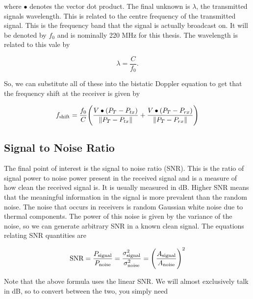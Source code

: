 \documentclass[12pt,openany,a4paper]{book}
\begin{document}
\bigskip

where $\bullet$ denotes the vector dot product. The final unknown is $\lambda$, the transmitted signals wavelength. This is related to the centre frequency of the transmitted signal. This is the frequency band that the signal is actually broadcast on. It will be denoted by $f_0$ and is nominally 220 MHz for this thesis. The wavelength is related to this vale by

\begin{equation}
\lambda = \frac{C}{f_0}.
\end{equation}

\bigskip

So, we can substitute all of these into the bistatic Doppler equation to get that the frequency shift at the receiver is given by

\begin{equation}
f_{\textnormal{shift}} = \frac{f_0}{C} \Bigg(\frac{V\bullet(P_T - P_{tx})}{\|P_T - P_{tx}\|} +  \frac{V\bullet(P_T - P_{rx})}{\|P_T - P_{rx}\|}\Bigg)
\end{equation}

\bigskip


\subsection{Signal to Noise Ratio}
\label{sec:snr}
The final point of interest is the signal to noise ratio (SNR). This is the ratio of signal power to noise power present in the received signal and is a measure of how clean the received signal is. It is usually measured in dB. Higher SNR means that the meaningful information in the signal is more prevalent than the random noise. The noise that occurs in receivers is random Gaussian white noise due to thermal components. The power of this noise is given by the variance of the noise, so we can generate arbitrary SNR in a known clean signal. The equations relating SNR quantities are

\begin{equation}
\textnormal{SNR} = \frac{P_{\textnormal{signal}}}{P_{\textnormal{noise}}} = \frac{\sigma_{\textnormal{signal}}^2}{\sigma_{\textnormal{noise}}^2} = \Bigg(\frac{A_{\textnormal{signal}}}{A_{\textnormal{noise}}} \Bigg)^2
\end{equation}

\bigskip

Note that the above formula uses the linear SNR. We will almost exclusively talk in dB, so to convert between the two, you simply need
\end{document}
